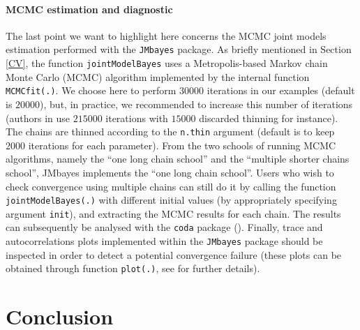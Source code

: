 \documentclass[12pt]{article}
\begin{document}
\paragraph{MCMC estimation and diagnostic}
The last point we want to highlight here concerns the MCMC joint models estimation performed with the \texttt{JMbayes} package. As briefly mentioned in Section \ref{CV}, the function \texttt{jointModelBayes} uses a Metropolis-based Markov chain Monte Carlo (MCMC) algorithm implemented by the internal function \texttt{MCMCfit(.)}. 
We choose here to perform $30000$ iterations in our examples (default is $20000$), but, in practice, we recommended to increase this number of iterations (authors in \cite{Rizopoulos_JASA} use $215000$ iterations with $15000$ discarded thinning for instance). The chains are thinned according to the \texttt{n.thin} argument (default is to keep $2000$ iterations for each parameter).
From the two schools of running MCMC algorithms, namely the ``one long chain school'' and the ``multiple shorter chains school'', JMbayes implements the ``one long chain school''. Users who wish to check convergence using multiple chains can still do it by calling the function \texttt{jointModelBayes(.)} with different initial values (by appropriately specifying argument \texttt{init}), and extracting the MCMC results for each chain. The results can subsequently
be analysed with the \texttt{coda} package (\cite{coda}). Finally, trace and autocorrelations plots implemented within the \texttt{JMbayes} package should be inspected in order to detect a potential convergence failure (these plots can be obtained through function \texttt{plot(.)}, see \cite{JMbayes} for further details).

\section{Conclusion}
\end{document}
